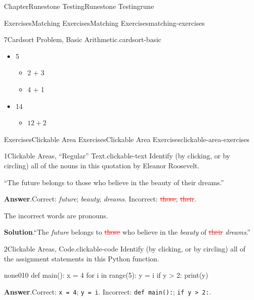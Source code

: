 \documentclass[oneside,10pt,]{book}
\newcommand{\blocktitlefont}{\relax}
\newcommand{\mono}[1]{\texttt{#1}}
\newcommand{\deletethick}{.25ex}
\newcommand{\deleted}[1]{\renewcommand{\ULthickness}{\deletethick}\textcolor{red}{\sout{#1}}}
\numberwithin{equation}{section}
\begin{document}
\begin{chapterptx}{Chapter}{Runestone Testing}{}{Runestone Testing}{}{}{rune}
\begin{exercises-section}{Exercises}{Matching Exercises}{}{Matching Exercises}{}{}{matching-exercises}
\begin{divisionexercise}{7}{Cardsort Problem, Basic Arithmetic.}{}{cardsort-basic}
\begin{itemize}[label=\textbullet]
\item{}5%
\begin{itemize}[label=$\circ$]
\item{}2 + 3%
\item{}4 + 1%
\end{itemize}
%
\item{}14%
\begin{itemize}[label=$\circ$]
\item{}\(12 + 2\)%
\end{itemize}
%
\end{itemize}
%
\end{divisionexercise}%
\end{exercises-section}
%
%
\typeout{************************************************}
\typeout{************************************************}
%
\begin{exercises-section}{Exercises}{Clickable Area Exercises}{}{Clickable Area Exercises}{}{}{clickable-area-exercises}
\begin{divisionexercise}{1}{Clickable Areas, ``Regular'' Text.}{}{clickable-text}%
Identify (by clicking, or by circling) all of the nouns in this quotation by Eleanor Roosevelt.%
\par
``The future belongs to those who believe in the beauty of their dreams.''%
\par\smallskip%
\noindent\textbf{\blocktitlefont Answer}.\hypertarget{clickable-text-3}{}\quad{}Correct: \emph{future}; \emph{beauty}; \emph{dreams}. Incorrect: \deleted{those}; \deleted{their}.%
\par
The incorrect words are pronouns.%
\par\smallskip%
\noindent\textbf{\blocktitlefont Solution}.\hypertarget{clickable-text-4}{}\quad{}``The \emph{future} belongs to \deleted{those} who believe in the \emph{beauty} of \deleted{their} \emph{dreams}.''%
\end{divisionexercise}%
\begin{divisionexercise}{2}{Clickable Areas, Code.}{}{clickable-code}%
Identify (by clicking, or by circling) all of the assignment statements in this Python function.%
\begin{program}{none}{0}{1}{0}
def main():
    x = 4
    for i in range(5):
        y = i
        if y > 2:
            print(y)
\end{program}
\par\smallskip%
\noindent\textbf{\blocktitlefont Answer}.\hypertarget{clickable-code-3}{}\quad{}Correct: \mono{x = 4}; \mono{y = i}. Incorrect: \mono{def main():}; \mono{if y > 2:}.%

\end{divisionexercise}
\end{exercises-section}
\end{chapterptx}
\end{document}
